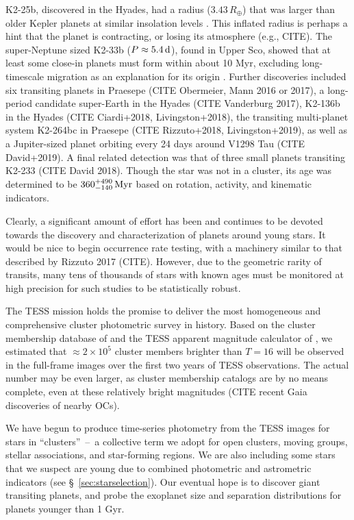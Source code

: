 \documentclass[12pt,twocolumn,tighten]{aastex62}
\begin{document}
K2-25b, discovered in the Hyades, had a radius ($3.43\,R_\oplus$) that
was larger than older Kepler planets at similar insolation levels
\citep{Mann_K2_25_2016}.  This inflated radius is perhaps a hint that
the planet is contracting, or losing its atmosphere (e.g., CITE).
The super-Neptune sized K2-33b ($P\approx 5.4\,{\rm d}$), found in
Upper Sco, showed that at least some close-in planets must form within
about 10 Myr, excluding long-timescale migration as an explanation for
its origin \citep{Mann_K2_33b_2016,David_et_al_2017}.
Further discoveries included six transiting planets in Praesepe (CITE
Obermeier, Mann 2016 or 2017), a long-period candidate super-Earth in
the Hyades (CITE Vanderburg 2017), K2-136b in the Hyades (CITE
Ciardi+2018, Livingston+2018), the transiting multi-planet system
K2-264bc in Praesepe (CITE Rizzuto+2018, Livingston+2019), as well as
a Jupiter-sized planet orbiting every 24 days around V1298 Tau (CITE
David+2019).
A final related detection was that of three small planets transiting
K2-233 (CITE David 2018).  Though the star was not in a cluster, its
age was determined to be $360_{-140}^{+490}\,{\rm Myr}$ based on
rotation, activity, and kinematic indicators.

Clearly, a significant amount of effort has been and continues to be
devoted towards the discovery and characterization of planets around
young stars.
It would be nice to begin occurrence rate testing, with a machinery
similar to that described by Rizzuto 2017 (CITE).
However, due to the geometric rarity of transits, many tens of
thousands of stars with known ages must be monitored at high precision
for such studies to be statistically robust.

The TESS mission \citep{ricker_transiting_2015} holds the promise to
deliver the most homogeneous and comprehensive cluster photometric
survey in history.  Based on the cluster membership database of
\citet{Kharchenko_et_al_2013} and the TESS apparent magnitude
calculator of \citet{Jaffe_Barclay_2017}, we estimated that $\approx
2\times10^5$ cluster members brighter than $T=16$ will be observed in
the full-frame images over the first two years of TESS observations.
The actual number may be even larger, as cluster membership catalogs
are by no means complete, even at these relatively bright magnitudes
(CITE recent Gaia discoveries of nearby OCs).

We have begun to produce time-series photometry from the TESS images
for stars in ``clusters''~--~a collective term we adopt for open
clusters, moving groups, stellar associations, and star-forming
regions.
We are also including some stars that we suspect are young due to
combined photometric and astrometric indicators (see
\S~\ref{sec:starselection}).
Our eventual hope is to discover giant transiting planets, and probe
the exoplanet size and separation distributions for planets younger
than 1 Gyr.
\end{document}
